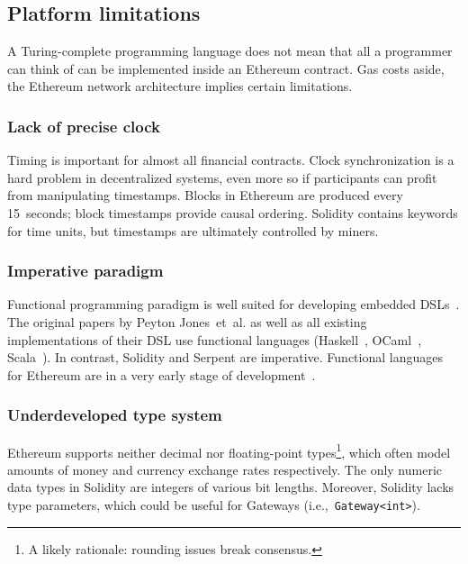 



\subsection{Platform limitations}

A Turing-complete programming language does not mean that all a programmer can think of can be implemented inside an Ethereum contract.
Gas costs aside, the Ethereum network architecture implies certain limitations.

\subsubsection{Lack of precise clock}

Timing is important for almost all financial contracts.
Clock synchronization is a hard problem in decentralized systems, even more so if participants can profit from manipulating timestamps.
Blocks in Ethereum are produced every 15~seconds; block timestamps provide causal ordering.
Solidity contains keywords for time units, but timestamps are ultimately controlled by miners.


\subsubsection{Imperative paradigm}
Functional programming paradigm is well suited for developing embedded DSLs~\cite{Gibbons2015}.
The original papers by Peyton Jones~et~al. as well as all existing implementations of their DSL use functional languages (Haskell~\cite{PeytonJones2000, Jones2003, Straaten2007}, OCaml~\cite{LexiFi}, Scala~\cite{Walton2012, Chaudhary2015}).
In contrast, Solidity and Serpent are imperative.
Functional languages for Ethereum are in a very early stage of development~\cite{FpEthereum2017}.


\subsubsection{Underdeveloped type system}
Ethereum supports neither decimal nor floating-point types\footnote{A likely rationale: rounding issues break consensus.}, which often model amounts of money and currency exchange rates respectively.
The only numeric data types in Solidity are integers of various bit lengths.
Moreover, Solidity lacks type parameters, which could be useful for Gateways (i.e.,~\texttt{Gateway<int>}).




